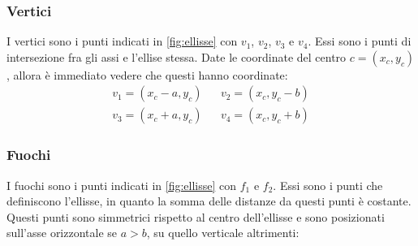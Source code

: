 \subsubsection{Vertici}
I vertici sono i punti indicati in \cref{fig:ellisse} con $ v_1 $, $ v_2 $, $ v_3 $ e $ v_4 $. Essi sono i punti di intersezione fra gli assi e l'ellise stessa. Date le coordinate del centro $ c = \left(x_c, y_c\right) $, allora è immediato vedere che questi hanno coordinate:
\begin{align*}
	v_1  = \left(x_c - a, y_c\right) &  & v_2  = \left(x_c, y_c - b\right) \\
	v_3  = \left(x_c + a, y_c\right) &  & v_4  = \left(x_c, y_c + b\right)
\end{align*}

\subsubsection{Fuochi}
I fuochi sono i punti indicati in \cref{fig:ellisse} con $ f_1 $ e $ f_2 $. Essi sono i punti che definiscono l'ellisse, in quanto la somma delle distanze da questi punti è costante. Questi punti sono simmetrici rispetto al centro dell'ellisse e sono posizionati sull'asse orizzontale se $ a > b $, su quello verticale altrimenti:

